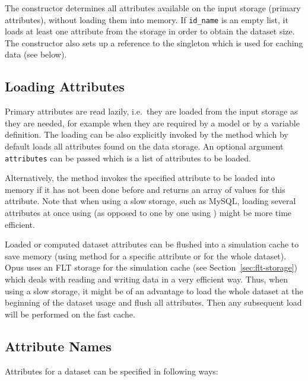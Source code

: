 The constructor determines all attributes available on the input storage
(primary attributes), without loading them into memory. If \verb|id_name|
is an empty list, it loads at least one attribute from the storage in order to
obtain the dataset size. The constructor also sets up a reference to the
singleton  which is used for caching data (see below).

%
\subsection{Loading Attributes}
%
Primary attributes are read lazily, i.e.\ they are loaded from the input
storage as they are needed, for example when they are required by a model or
by a variable definition. The loading can be also explicitly invoked by the
method  which by default loads all attributes found on
the data storage. An optional argument \verb|attributes| can be passed which
is a list of attributes to be loaded.

Alternatively, the method  invokes the specified
attribute to be loaded into memory if it has not been done before and returns
an array of values for this attribute. Note that when using a slow storage,
such as MySQL, loading several attributes at once using  
(as opposed to one by one using ) might be more
time efficient. 

Loaded or computed dataset attributes can be flushed into a simulation cache to
save memory  (using method
 for a specific attribute or
 for the whole dataset). Opus uses an FLT storage for
the simulation cache (see Section~\ref{sec:flt-storage}) which deals with
reading and writing data in a very efficient way. Thus, when using a slow
storage, it might be of an advantage to load the whole dataset at the beginning
of the dataset usage and flush all attributes. Then any subsequent load will be
performed on the fast cache.

\subsection{Attribute Names}
\label{sec:opus-core-attribute-names}
%
Attributes for a dataset can be specified in following ways:

